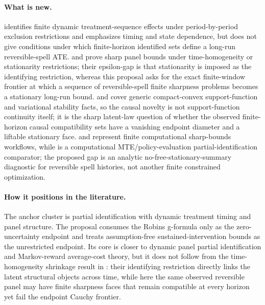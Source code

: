 \documentclass[11pt]{article}
\theoremstyle{definition}
\theoremstyle{plain}
\theoremstyle{remark}
\begin{document}
\paragraph{What is new.}
\citet{Han2021} identifies finite dynamic treatment-sequence effects under period-by-period exclusion restrictions and emphasizes timing and state dependence, but does not give conditions under which finite-horizon identified sets define a long-run reversible-spell ATE.  \citet{ChernozhukovFernandezValHahnNewey2013} and \citet{JunLeeShin2016} prove sharp panel bounds under time-homogeneity or stationarity restrictions; their epsilon-gap is that stationarity is imposed as the identifying restriction, whereas this proposal asks for the exact finite-window frontier at which a sequence of reversible-spell finite sharpness problems becomes a stationary long-run bound.  \citet{Schneider1993} and \citet{RockafellarWets1998} cover generic compact-convex support-function and variational stability facts, so the causal novelty is not support-function continuity itself; it is the sharp latent-law question of whether the observed finite-horizon causal compatibility sets have a vanishing endpoint diameter and a liftable stationary face.  \citet{KalouptsidiKitamuraLimaSouzaRodrigues2020} and \citet{DuarteFinkelsteinKnoxMummoloShpitser2024} represent finite computational sharp-bounds workflows, while \citet{HanYang2024} is a computational MTE/policy-evaluation partial-identification comparator; the proposed gap is an analytic no-free-stationary-summary diagnostic for reversible spell histories, not another finite constrained optimization.

\paragraph{How it positions in the literature.}
The anchor cluster is partial identification with dynamic treatment timing and panel structure.  The proposal consumes the Robins g-formula only as the zero-uncertainty endpoint and treats assumption-free sustained-intervention bounds as the unrestricted endpoint.  Its core is closer to dynamic panel partial identification and Markov-reward average-cost theory, but it does not follow from the time-homogeneity shrinkage result in \citet{ChernozhukovFernandezValHahnNewey2013}: their identifying restriction directly links the latent structural objects across time, while here the same observed reversible panel may have finite sharpness faces that remain compatible at every horizon yet fail the endpoint Cauchy frontier.
\end{document}
